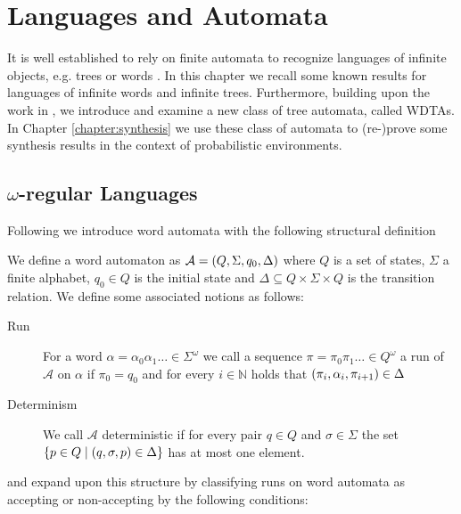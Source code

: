 \chapter{Languages and Automata}
It is well established to rely on finite automata to recognize languages of
infinite objects, e.g. trees or words \cite{LangAutoLog}. In this chapter we
recall some known results for languages of infinite words and infinite trees.
Furthermore, building upon the work in \cite{RandAutoInfTrees}, we introduce and
examine a new class of tree automata, called \aclp*{WDTA}. In Chapter
\ref{chapter:synthesis} we use these class of automata to (re-)prove some
synthesis results in the context of probabilistic environments.

\section{$\omega$-regular Languages}
Following \cite{LangAutoLog} we introduce word automata with the following
structural definition
\begin{definition}
  We define a word automaton as
  $\mathcal{A} = \left(Q, \Sigma, q_{0}, \Delta\right)$ where
  $Q$ is a set of states, $\Sigma$ a finite alphabet, $q_{0}\in Q$ is the
  initial state and $\Delta\subseteq Q\times\Sigma\times Q$ is the transition
  relation. We define some associated notions as follows:
  \begin{description}
    \item [Run]
      For a word $\alpha = \alpha_{0}\alpha_{1}\dots\in\Sigma^{\omega}$ we call
      a sequence $\pi = \pi_{0}\pi_{1}\dots \in Q^{\omega}$ a run of
      $\mathcal{A}$ on $\alpha$ if $\pi_{0} = q_{0}$ and for every
      $i\in\mathbb{N}$ holds that
      $\left(\pi_{i}, \alpha_{i}, \pi_{i+1}\right)\in\Delta$
    \item [Determinism]
      We call $\mathcal{A}$ deterministic if for every pair $q\in Q$ and
      $\sigma\in\Sigma$ the set
      $\left\{p\in Q\mid\left(q,\sigma,p\right)\in\Delta\right\}$ has at most one
      element.
  \end{description}
\end{definition}
and expand upon this structure by classifying runs on word automata as
accepting or non-accepting by the following conditions:
